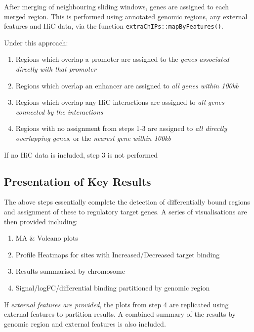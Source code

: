 \documentclass[
]{book}
\providecommand{\tightlist}{%
  \setlength{\itemsep}{0pt}\setlength{\parskip}{0pt}}
\begin{document}
After merging of neighbouring sliding windows, genes are assigned to each merged region.
This is performed using annotated genomic regions, any external features and HiC data, via the function \texttt{extraChIPs::mapByFeatures()}.

Under this approach:

\begin{enumerate}
\def\labelenumi{\arabic{enumi}.}
\tightlist
\item
  Regions which overlap a promoter are assigned to the \emph{genes associated directly with that promoter}
\item
  Regions which overlap an enhancer are assigned to \emph{all genes within 100kb}
\item
  Regions which overlap any HiC interactions are assigned to \emph{all genes connected by the interactions}
\item
  Regions with no assignment from steps 1-3 are assigned to \emph{all directly overlapping genes}, or the \emph{nearest gene within 100kb}
\end{enumerate}

If no HiC data is included, step 3 is not performed

\hypertarget{presentation-of-key-results}{%
\subsection*{Presentation of Key Results}\label{presentation-of-key-results}}

The above steps essentially complete the detection of differentially bound regions and assignment of these to regulatory target genes.
A series of visualisations are then provided including:

\begin{enumerate}
\def\labelenumi{\arabic{enumi}.}
\tightlist
\item
  MA \& Volcano plots
\item
  Profile Heatmaps for sites with Increased/Decreased target binding
\item
  Results summarised by chromosome
\item
  Signal/logFC/differential binding partitioned by genomic region
\end{enumerate}

If \emph{external features are provided}, the plots from step 4 are replicated using external features to partition results.
A combined summary of the results by genomic region and external features is also included.
\end{document}

